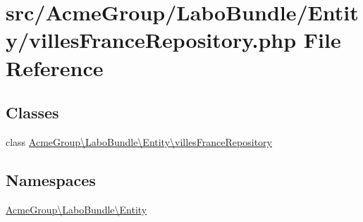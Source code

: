 \hypertarget{villes_france_repository_8php}{\section{src/\+Acme\+Group/\+Labo\+Bundle/\+Entity/villes\+France\+Repository.php File Reference}
\label{villes_france_repository_8php}
}
\subsection*{Classes}
\begin{DoxyCompactItemize}
\item 
class \hyperlink{class_acme_group_1_1_labo_bundle_1_1_entity_1_1villes_france_repository}{Acme\+Group\textbackslash{}\+Labo\+Bundle\textbackslash{}\+Entity\textbackslash{}villes\+France\+Repository}
\end{DoxyCompactItemize}
\subsection*{Namespaces}
\begin{DoxyCompactItemize}
\item 
 \hyperlink{namespace_acme_group_1_1_labo_bundle_1_1_entity}{Acme\+Group\textbackslash{}\+Labo\+Bundle\textbackslash{}\+Entity}
\end{DoxyCompactItemize}
